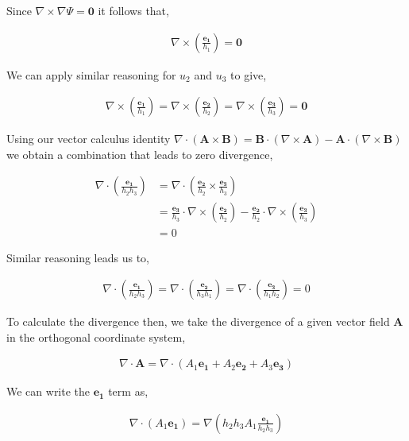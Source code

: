\documentclass[11pt]{amsart}
\begin{document}
Since $\nabla\times\nabla\Psi = \mathbf{0}$ it follows that,

\begin{align*}
  \nabla\times\left(\frac{\mathbf{e_1}}{h_1}\right) = \mathbf{0}
\end{align*}

We can apply similar reasoning for $u_2$ and $u_3$ to give,

\begin{align*}
  \nabla\times\left(\frac{\mathbf{e_1}}{h_1}\right) = \nabla\times\left(\frac{\mathbf{e_2}}{h_2}\right) = \nabla\times\left(\frac{\mathbf{e_3}}{h_3}\right) = \mathbf{0}
\end{align*}

Using our vector calculus identity $\nabla\cdot(\mathbf{A}\times\mathbf{B}) = \mathbf{B}\cdot(\nabla\times\mathbf{A}) - \mathbf{A}\cdot(\nabla\times\mathbf{B})$ we obtain a combination that leads to zero divergence,

\begin{align*}
  \nabla\cdot\left(\frac{\mathbf{e_1}}{h_2h_3}\right) &= \nabla\cdot\left(\frac{\mathbf{e_2}}{h_2}\times\frac{\mathbf{e_3}}{h_3}\right) \\
                                                      &= \frac{\mathbf{e_3}}{h_3}\cdot\nabla\times\left(\frac{\mathbf{e_2}}{h_2}\right) - \frac{\mathbf{e_2}}{h_2}\cdot\nabla\times\left(\frac{\mathbf{e_3}}{h_3}\right) \\
                                                      &= 0
\end{align*}

Similar reasoning leads us to,

\begin{align*}
  \nabla\cdot\left(\frac{\mathbf{e_1}}{h_2h_3}\right)=\nabla\cdot\left(\frac{\mathbf{e_2}}{h_3h_1}\right)=\nabla\cdot\left(\frac{\mathbf{e_3}}{h_1h_2}\right)=0
\end{align*}

To calculate the divergence then, we take the divergence of a given vector field $\mathbf{A}$ in the orthogonal coordinate system,

\begin{align*}
  \nabla\cdot\mathbf{A}=\nabla\cdot(A_1\mathbf{e_1}+A_2\mathbf{e_2}+A_3\mathbf{e_3})
\end{align*}

We can write the $\mathbf{e_1}$ term as,

\begin{align*}
  \nabla\cdot(A_1\mathbf{e_1})=\nabla(h_2h_3A_1\frac{\mathbf{e_1}}{h_2h_3})
\end{align*}
\end{document}

